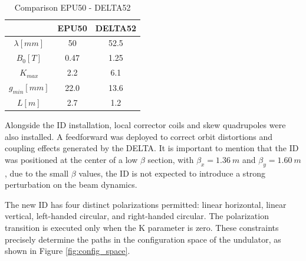 \documentclass[a4paper,
               keeplastbox,   %
               ]{jacow}
\begin{document}



\begin{table}[h]
\centering
\caption{Comparison EPU50 - DELTA52}
\begin{tabular}{|c|c|c|}
\hline
                      & EPU50 & DELTA52 \\ \hline
$\lambda \unit{[mm]}$ & 50    & 52.5    \\ \hline
$B_{0} \unit{[T]}$    & 0.47  & 1.25    \\ \hline
$K_{max}$             & 2.2   & 6.1     \\ \hline
$g_{min} \unit{[mm]}$ & 22.0  & 13.6    \\ \hline
$L \unit{[m]}$        & 2.7   & 1.2     \\ \hline
\end{tabular}
\label{table1}
\end{table}


Alongside the ID installation, local corrector coils and skew quadrupoles were also installed. A feedforward was deployed to correct orbit distortions and coupling effects generated by the DELTA. It is important to mention that the ID was positioned at the center of a low $\beta$ section, with $\beta_{x} = \SI{1.36}{m}$ and $\beta_{y} = \SI{1.60}{m}$, due to the small $\beta$ values, the ID is not expected to introduce a strong perturbation on the beam dynamics.

The new ID has four distinct polarizations permitted: linear horizontal, linear vertical, left-handed circular, and right-handed circular. The polarization transition is executed only when the K parameter is zero. These constraints precisely determine the paths in the configuration space of the undulator, as shown in Figure \ref{fig:config_space}. 
\end{document}

